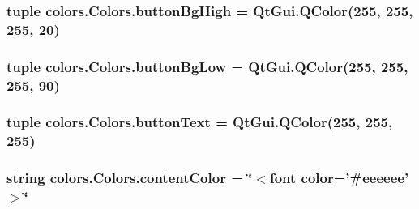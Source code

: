 \subsubsection[{button\+Bg\+High}]{\setlength{\rightskip}{0pt plus 5cm}tuple colors.\+Colors.\+button\+Bg\+High = Qt\+Gui.\+Q\+Color(255, 255, 255, 20)\hspace{0.3cm}{\ttfamily [static]}}\label{classcolors_1_1Colors_a8d89d5462b950e97281ce67ad71cba16}
\hypertarget{classcolors_1_1Colors_ae907e6fc79d56dc05a8ab6bae4733883}{}
\subsubsection[{button\+Bg\+Low}]{\setlength{\rightskip}{0pt plus 5cm}tuple colors.\+Colors.\+button\+Bg\+Low = Qt\+Gui.\+Q\+Color(255, 255, 255, 90)\hspace{0.3cm}{\ttfamily [static]}}\label{classcolors_1_1Colors_ae907e6fc79d56dc05a8ab6bae4733883}
\hypertarget{classcolors_1_1Colors_aee3b8e129ec929e5a544f8dff5ae46d4}{}
\subsubsection[{button\+Text}]{\setlength{\rightskip}{0pt plus 5cm}tuple colors.\+Colors.\+button\+Text = Qt\+Gui.\+Q\+Color(255, 255, 255)\hspace{0.3cm}{\ttfamily [static]}}\label{classcolors_1_1Colors_aee3b8e129ec929e5a544f8dff5ae46d4}
\hypertarget{classcolors_1_1Colors_ad8853f34d096c971551570dcff0ae846}{}
\subsubsection[{content\+Color}]{\setlength{\rightskip}{0pt plus 5cm}string colors.\+Colors.\+content\+Color = \char`\"{}$<$font color='\#eeeeee'$>$\char`\"{}\hspace{0.3cm}{\ttfamily [static]}}\label{classcolors_1_1Colors_ad8853f34d096c971551570dcff0ae846}
\hypertarget{classcolors_1_1Colors_a9663c9e60e3cfc48f749a9b436fde2f4}{}
